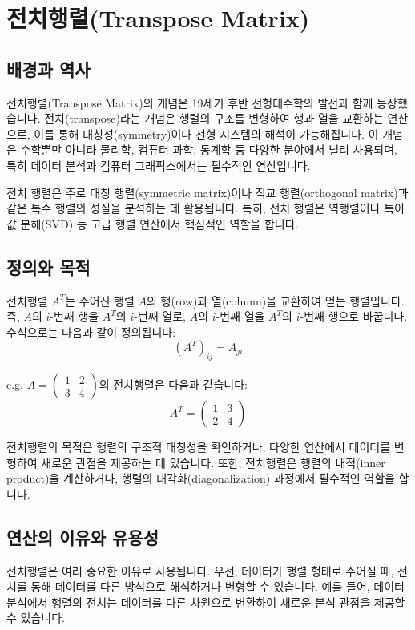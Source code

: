\section{전치행렬(Transpose Matrix)}

\subsection{배경과 역사}
전치행렬(Transpose Matrix)의 개념은 19세기 후반 선형대수학의 발전과 함께 등장했습니다. 전치(transpose)라는 개념은 행렬의 구조를 변형하여 행과 열을 교환하는 연산으로, 이를 통해 대칭성(symmetry)이나 선형 시스템의 해석이 가능해집니다. 이 개념은 수학뿐만 아니라 물리학, 컴퓨터 과학, 통계학 등 다양한 분야에서 널리 사용되며, 특히 데이터 분석과 컴퓨터 그래픽스에서는 필수적인 연산입니다.

전치 행렬은 주로 대칭 행렬(symmetric matrix)이나 직교 행렬(orthogonal matrix)과 같은 특수 행렬의 성질을 분석하는 데 활용됩니다. 특히, 전치 행렬은 역행렬이나 특이값 분해(SVD) 등 고급 행렬 연산에서 핵심적인 역할을 합니다.

\subsection{정의와 목적}
전치행렬 \( A^T \)는 주어진 행렬 \( A \)의 행(row)과 열(column)을 교환하여 얻는 행렬입니다. 즉, \( A \)의 \(i\)-번째 행을 \( A^T \)의 \(i\)-번째 열로, \( A \)의 \(i\)-번째 열을 \( A^T \)의 \(i\)-번째 행으로 바꿉니다. 수식으로는 다음과 같이 정의됩니다:
\[
  (A^T)_{ij} = A_{ji}
\]

\vspace{1\baselineskip}
\noindent {} e.g. \( A = \begin{pmatrix} 1 & 2 \\ 3 & 4 \end{pmatrix} \)의 전치행렬은 다음과 같습니다:
\[
  A^T = \begin{pmatrix} 1 & 3 \\ 2 & 4 \end{pmatrix}
\]

\noindent 전치행렬의 목적은 행렬의 구조적 대칭성을 확인하거나, 다양한 연산에서 데이터를 변형하여 새로운 관점을 제공하는 데 있습니다. 또한, 전치행렬은 행렬의 내적(inner product)을 계산하거나, 행렬의 대각화(diagonalization) 과정에서 필수적인 역할을 합니다.

\subsection{연산의 이유와 유용성}
전치행렬은 여러 중요한 이유로 사용됩니다. 우선, 데이터가 행렬 형태로 주어질 때, 전치를 통해 데이터를 다른 방식으로 해석하거나 변형할 수 있습니다. 예를 들어, 데이터 분석에서 행렬의 전치는 데이터를 다른 차원으로 변환하여 새로운 분석 관점을 제공할 수 있습니다.

